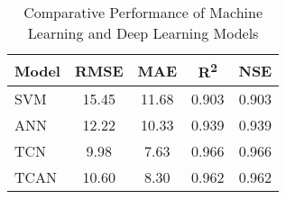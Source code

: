 \begin{table}[ht]
\centering
\caption{Comparative Performance of Machine Learning and Deep Learning Models}
\vspace{0.5em}%
\begin{tabular}{|l|c|c|c|c|}
\hline
\textbf{Model} & \textbf{RMSE} & \textbf{MAE} & \textbf{R\textsuperscript{2}} & \textbf{NSE} \\
\hline
SVM  & 15.45 & 11.68 & 0.903 & 0.903 \\
ANN  & 12.22 & 10.33 & 0.939 & 0.939 \\
TCN  & 9.98  & 7.63  & 0.966 & 0.966 \\
TCAN & 10.60 & 8.30  & 0.962 & 0.962 \\
\hline
\end{tabular}
\label{tab:performance}
\end{table}